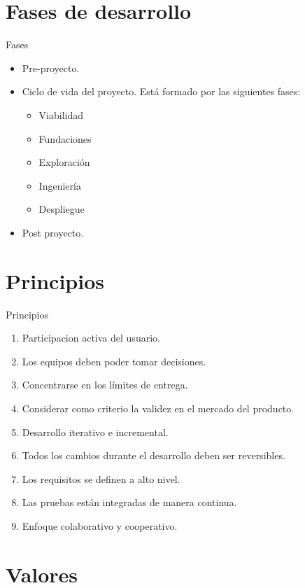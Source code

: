 \documentclass[usenames,dvipsnames]{beamer}
\begin{document}
\section{Fases de desarrollo}
\begin{frame}{Fases}
    \begin{itemize}
        \item Pre-proyecto. 
\item Ciclo de vida del proyecto. Está formado por las siguientes fases:
\begin{itemize}
    \item Viabilidad
    \item Fundaciones
    \item Exploración
    \item Ingeniería
    \item Despliegue
\end{itemize}{}
\item Post proyecto.

    \end{itemize}{}
\end{frame}


\section{Principios}

\begin{frame}{Principios}
    \begin{enumerate}
        \item Participacion activa del usuario.
        \item Los equipos deben poder tomar decisiones.
        \item Concentrarse en los límites de entrega.
        \item Considerar como criterio la validez en el mercado del producto.
        \item Desarrollo iterativo e incremental.
        \item Todos los cambios durante el desarrollo deben ser reversibles.
        \item Los requisitos se definen a alto nivel.
        \item Las pruebas están integradas de manera continua.
        \item Enfoque colaborativo y cooperativo.
    \end{enumerate}{}
\end{frame}{}

\section{Valores}
\end{document}
